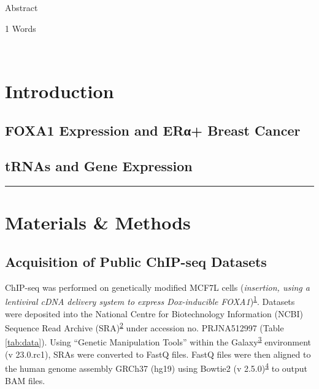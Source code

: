 \documentclass[
  12pt,
]{article}
\begin{document}
Abstract

\normalsize
\begin{flushright}
1 Words
\end{flushright}
\hrulefill\\
\setlength{\parindent}{10pt}

\hypertarget{introduction}{%
\section{Introduction}\label{introduction}}

\hypertarget{foxa1-expression-and-erux3b1-breast-cancer}{%
\subsection{FOXA1 Expression and ERα+ Breast Cancer}\label{foxa1-expression-and-erux3b1-breast-cancer}}

\hypertarget{trnas-and-gene-expression}{%
\subsection{tRNAs and Gene Expression}\label{trnas-and-gene-expression}}

\begin{center}\rule{0.5\linewidth}{0.5pt}\end{center}

\hypertarget{materials-methods}{%
\section{Materials \& Methods}\label{materials-methods}}

\hypertarget{acquisition-of-public-chip-seq-datasets}{%
\subsection{Acquisition of Public ChIP-seq Datasets}\label{acquisition-of-public-chip-seq-datasets}}

ChIP-seq was performed on genetically modified MCF7L cells (\emph{insertion, using a lentiviral cDNA delivery system to express Dox-inducible FOXA1})\textsuperscript{\protect\hyperlink{ref-fu2019}{1}}.
Datasets were deposited into the National Centre for Biotechnology Information (NCBI) Sequence Read Archive (SRA)\textsuperscript{\protect\hyperlink{ref-leinonen2010}{2}} under accession no.
PRJNA512997 (Table \ref{tab:data}).
Using ``Genetic Manipulation Tools'' within the Galaxy\textsuperscript{\protect\hyperlink{ref-thegala2022}{3}} environment (v 23.0.rc1), SRAs were converted to FastQ files.
FastQ files were then aligned to the human genome assembly GRCh37 (hg19) using Bowtie2 (v 2.5.0)\textsuperscript{\protect\hyperlink{ref-langmead2012}{4}} to output BAM files.
\end{document}
